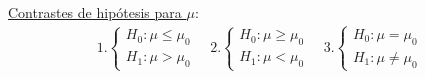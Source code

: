 \underline{Contrastes de hipótesis para $\mu$}:
\begin{align*}
    1. \begin{cases}
           H_0 : \mu \leq \mu_0 \\
           H_1 : \mu > \mu_0
       \end{cases} \quad     2.\begin{cases}
                                   H_0 : \mu \ge \mu_0 \\
                                   H_1 : \mu < \mu_0
                               \end{cases} \quad     3.\begin{cases}
                                                           H_0 : \mu = \mu_0 \\
                                                           H_1 : \mu \not = \mu_0
                                                       \end{cases}
\end{align*}

